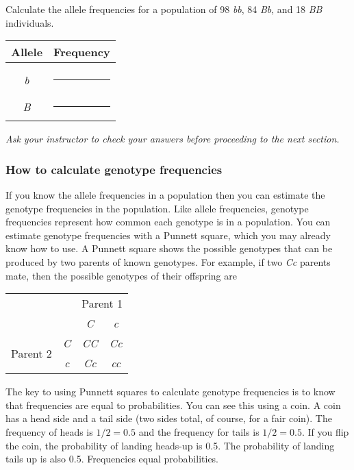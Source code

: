 \documentclass[12pt]{exam}
\newcommand{\allele}[1]{\textit{#1}}
\begin{document}
\begin{questions}

\question
Calculate the allele frequencies for a population of 98 \allele{bb}, 84 \allele{Bb}, and 18 \allele{BB} individuals.

\begin{tabular}{@{}cc@{}}
	\toprule
	Allele & Frequency\tabularnewline
	\midrule
	 & \tabularnewline
	\allele{b} & \rule{0.5in}{0.4pt}\tabularnewline[2em]
	\allele{B} & \rule{0.5in}{0.4pt}\tabularnewline
	\bottomrule 
\end{tabular}

\vspace*{\baselineskip}

\emph{Ask your instructor to check your answers before proceeding to the next section.}

\newpage

\subsubsection*{How to calculate genotype frequencies}

If you know the allele frequencies in a population then you can estimate the genotype frequencies in the population. Like allele frequencies, genotype frequencies represent how common each genotype is in a population.  You can estimate genotype frequencies with a Punnett square, which you may already know how to use.  A Punnett square shows the possible genotypes that can be produced by two parents of known genotypes. For example, if two \allele{Cc} parents mate, then the possible genotypes of their offspring are

\begin{center}
	\begin{tabular}{cc|c|c|}
		\multicolumn{2}{c}{}	& \multicolumn{2}{c}{Parent 1}\tabularnewline
		\multicolumn{2}{c}{}	& \multicolumn{1}{c}{\allele{C}}	& \multicolumn{1}{c}{\allele{c}} \tabularnewline
		\cline{3-4}
		\multirow{2}{*}{Parent 2}	& \allele{C}	& \allele{CC}	& \allele{Cc} \tabularnewline
		\cline{3-4}
				&	\allele{c} & \allele{Cc}	& \allele{cc}	\tabularnewline
		\cline{3-4}
	\end{tabular}
\end{center}

\bigskip

The key to using Punnett squares to calculate genotype frequencies is to know that frequencies are equal to probabilities. You can see this using a coin.  A coin has a head side and a tail side (two sides total, of course, for a fair coin). The frequency of heads is $1/2 = 0.5$ and the frequency for tails is $1/2 = 0.5$.  If you flip the coin, the probability of landing heads-up is 0.5. The probability of landing tails up is also 0.5. Frequencies equal probabilities.


\end{questions}
\end{document}
